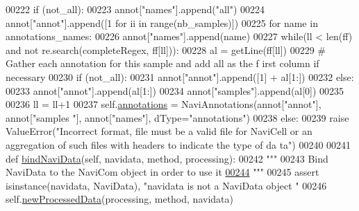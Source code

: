 \begin{DoxyCode}
00222                 \textcolor{keywordflow}{if} (not\_all):
00223                     annot[\textcolor{stringliteral}{"names"}].append(\textcolor{stringliteral}{"all"})
00224                     annot[\textcolor{stringliteral}{"annot"}].append([1 \textcolor{keywordflow}{for} ii \textcolor{keywordflow}{in} range(nb\_samples)])
00225                 \textcolor{keywordflow}{for} name \textcolor{keywordflow}{in} annotations\_names:
00226                     annot[\textcolor{stringliteral}{"names"}].append(name)
00227                 \textcolor{keywordflow}{while}(ll < len(ff) \textcolor{keywordflow}{and} \textcolor{keywordflow}{not} re.search(completeRegex, ff[ll])):
00228                     al = getLine(ff[ll])
00229                     \textcolor{comment}{# Gather each annotation for this sample and add all as the f
      irst column if necessary}
00230                     \textcolor{keywordflow}{if} (not\_all):
00231                         annot[\textcolor{stringliteral}{"annot"}].append([1] + al[1:])
00232                     \textcolor{keywordflow}{else}:
00233                         annot[\textcolor{stringliteral}{"annot"}].append(al[1:])
00234                     annot[\textcolor{stringliteral}{"samples"}].append(al[0])
00235 
00236                     ll = ll+1
00237                 self.\hyperlink{classnavicom_1_1navicom_1_1NaviCom_a0386d881214943cf3432d0ffe22cbb71}{annotations} = NaviAnnotations(annot[\textcolor{stringliteral}{"annot"}], annot[\textcolor{stringliteral}{"samples
      "}], annot[\textcolor{stringliteral}{"names"}], dType=\textcolor{stringliteral}{"annotations"})
00238             \textcolor{keywordflow}{else}:
00239                 \textcolor{keywordflow}{raise} ValueError(\textcolor{stringliteral}{"Incorrect format, file must be a valid file for
       NaviCell or an aggregation of such files with headers to indicate the type of da
      ta"})
00240 
00241     \textcolor{keyword}{def }\hyperlink{classnavicom_1_1navicom_1_1NaviCom_ae310adb1d4e8932f0b72b6d8b6ca6301}{bindNaviData}(self, navidata, method, processing):
00242         \textcolor{stringliteral}{"""}
00243 \textcolor{stringliteral}{        Bind NaviData to the NaviCom object in order to use it }
\hypertarget{navicom_8py_source_l00244}{}\hyperlink{classnavicom_1_1navicom_1_1NaviCom_ae310adb1d4e8932f0b72b6d8b6ca6301}{00244} \textcolor{stringliteral}{        """}
00245         \textcolor{keyword}{assert} isinstance(navidata, NaviData), \textcolor{stringliteral}{"navidata is not a NaviData object
      "}
00246         self.\hyperlink{classnavicom_1_1navicom_1_1NaviCom_a42c3198667c80bbf3d61a3d57b39a883}{newProcessedData}(processing, method, navidata)

\end{DoxyCode}
